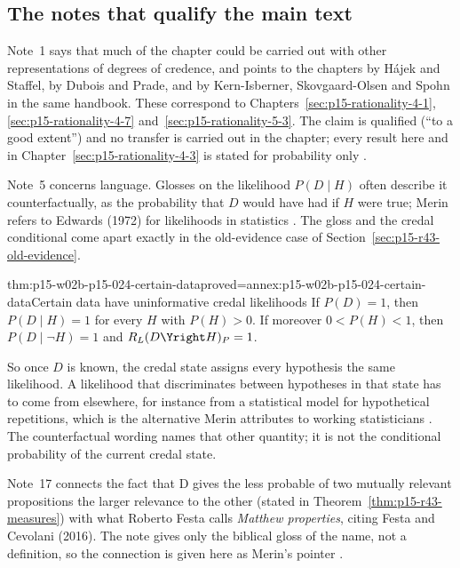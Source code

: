 \subsection{The notes that qualify the main text}
\label{sec:p15-w02b-p15-024-notes}

Note~1 says that much of the chapter could be carried out with other
representations of degrees of credence, and points to the chapters by
H\'ajek and Staffel, by Dubois and Prade, and by Kern-Isberner,
Skovgaard-Olsen and Spohn in the same handbook. These correspond to
Chapters~\ref{sec:p15-rationality-4-1}, \ref{sec:p15-rationality-4-7}
and~\ref{sec:p15-rationality-5-3}. The claim is qualified (``to a good
extent'') and no transfer is carried out in the chapter; every result
here and in Chapter~\ref{sec:p15-rationality-4-3} is stated for
probability only \cite[p.~265 and p.~274, n.~1]{Merin2021Relevance}.

Note~5 concerns language. Glosses on the likelihood \(P(D\mid H)\)
often describe it counterfactually, as the probability that \(D\)
would have had if \(H\) were true; Merin refers to Edwards (1972) for
likelihoods in statistics \cite[p.~274, n.~5]{Merin2021Relevance}.
The gloss and the credal conditional come apart exactly in the
old-evidence case of Section~\ref{sec:p15-r43-old-evidence}.

\begin{hbtheorem}{thm:p15-w02b-p15-024-certain-data}{proved=annex:p15-w02b-p15-024-certain-data}{Certain data have uninformative credal likelihoods}
If \(P(D)=1\), then \(P(D\mid H)=1\) for every \(H\) with
\(P(H)>0\). If moreover \(0<P(H)<1\), then
\(P(D\mid\neg H)=1\) and \(R_L(D\Yright H)_P=1\).
\end{hbtheorem}

So once \(D\) is known, the credal state assigns every hypothesis the
same likelihood. A likelihood that discriminates between hypotheses in
that state has to come from elsewhere, for instance from a statistical
model for hypothetical repetitions, which is the alternative Merin
attributes to working statisticians \cite[p.~268]{Merin2021Relevance}.
The counterfactual wording names that other quantity; it is not the
conditional probability of the current credal state.

Note~17 connects the fact that D gives the less probable of two mutually
relevant propositions the larger relevance to the other (stated in
Theorem~\ref{thm:p15-r43-measures}) with what Roberto Festa calls
\emph{Matthew properties}, citing Festa and Cevolani (2016). The note
gives only the biblical gloss of the name, not a definition, so the
connection is given here as Merin's pointer
\cite[p.~272 and p.~274, n.~17]{Merin2021Relevance}.

